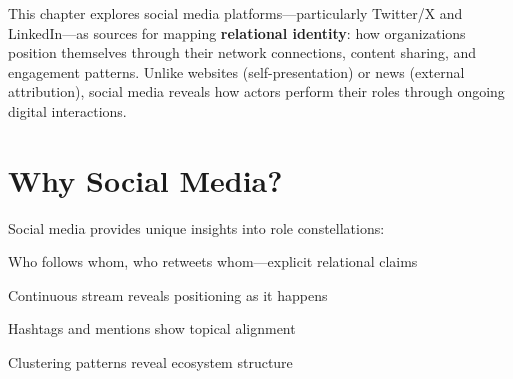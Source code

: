 \documentclass[../main.tex]{subfiles}
\begin{document}

\begin{center}
\end{center}

\vspace{0.5cm}

\begin{chapteroverview}
This chapter explores social media platforms---particularly Twitter/X and LinkedIn---as sources for mapping \textbf{relational identity}: how organizations position themselves through their network connections, content sharing, and engagement patterns. Unlike websites (self-presentation) or news (external attribution), social media reveals how actors perform their roles through ongoing digital interactions.
\end{chapteroverview}


\section*{Why Social Media?}

Social media provides unique insights into role constellations:


\begin{description}[leftmargin=0.5cm, itemsep=0.3em]
\item[Network Visibility] Who follows whom, who retweets whom---explicit relational claims
\item[Real-time Dynamics] Continuous stream reveals positioning as it happens
\item[Discourse Participation] Hashtags and mentions show topical alignment
\item[Community Boundaries] Clustering patterns reveal ecosystem structure
\end{description}
\end{document}
